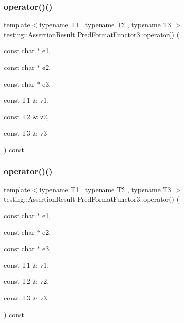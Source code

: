 \subsubsection{\texorpdfstring{operator()()}{operator()()}\hspace{0.1cm}{\footnotesize\ttfamily [1/3]}}
{\footnotesize\ttfamily template$<$typename T1 , typename T2 , typename T3 $>$ \\
testing\+::\+Assertion\+Result Pred\+Format\+Functor3\+::operator() (\begin{DoxyParamCaption}\item[{const char $\ast$}]{e1,  }\item[{const char $\ast$}]{e2,  }\item[{const char $\ast$}]{e3,  }\item[{const T1 \&}]{v1,  }\item[{const T2 \&}]{v2,  }\item[{const T3 \&}]{v3 }\end{DoxyParamCaption}) const\hspace{0.3cm}{\ttfamily [inline]}}

\mbox{\label{struct_pred_format_functor3_a35575b0ed1e572d3a31603b07a3f6b30}} 
\subsubsection{\texorpdfstring{operator()()}{operator()()}\hspace{0.1cm}{\footnotesize\ttfamily [2/3]}}
{\footnotesize\ttfamily template$<$typename T1 , typename T2 , typename T3 $>$ \\
testing\+::\+Assertion\+Result Pred\+Format\+Functor3\+::operator() (\begin{DoxyParamCaption}\item[{const char $\ast$}]{e1,  }\item[{const char $\ast$}]{e2,  }\item[{const char $\ast$}]{e3,  }\item[{const T1 \&}]{v1,  }\item[{const T2 \&}]{v2,  }\item[{const T3 \&}]{v3 }\end{DoxyParamCaption}) const\hspace{0.3cm}{\ttfamily [inline]}}

